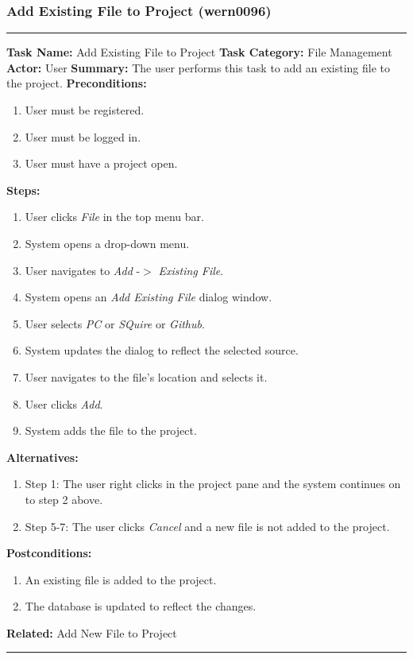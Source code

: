 \documentclass[11pt]{report}
\begin{document}
\subsubsection{Add Existing File to Project (wern0096)}
\vspace{2pt}
\hrule
\vspace{8pt}
	\noindent\textbf{Task Name:} Add Existing File to Project \newline
	\textbf{Task Category:} File Management \newline
	\textbf{Actor:} User \newline
	\textbf{Summary:} The user performs this task to add an existing file to the project. \newline
	\textbf{Preconditions:}
	\begin{enumerate}
		\item User must be registered.
		\item User must be logged in.
		\item User must have a project open.
	\end{enumerate}
	\textbf{Steps:}
	\begin{enumerate}
		\item User clicks \textit{File} in the top menu bar.
		\item System opens a drop-down menu.
		\item User navigates to \textit{Add} -$>$ \textit{Existing File}.
		\item System opens an \textit{Add Existing File} dialog window.
		\item User selects \textit{PC} or \textit{SQuire} or \textit{Github}.
		\item System updates the dialog to reflect the selected source.
		\item User navigates to the file's location and selects it.
		\item User clicks \textit{Add}.
		\item System adds the file to the project.
	\end{enumerate}
	\textbf{Alternatives:}
	\begin{enumerate}
		\item Step 1: The user right clicks in the project pane and the system continues on to step 2 above.
		\item Step 5-7: The user clicks \textit{Cancel} and a new file is not added to the project.
	\end{enumerate}
	\textbf{Postconditions:}
	\begin{enumerate}
		\item An existing file is added to the project.
		\item The database is updated to reflect the changes.
	\end{enumerate}
	\textbf{Related:} Add New File to Project
\vspace{8pt}
\hrule
\newpage
\end{document}
